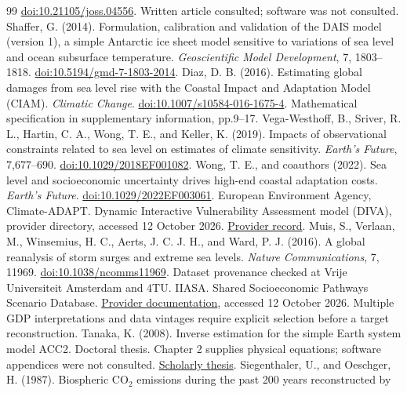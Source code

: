 \documentclass[11pt]{article}
\begin{document}
\begin{thebibliography}{99}
\href{https://doi.org/10.21105/joss.04556}{doi:10.21105/joss.04556}.
Written article consulted; software was not consulted.
 Shaffer, G. (2014). Formulation, calibration and validation
of the DAIS model (version 1), a simple Antarctic ice sheet model sensitive to
variations of sea level and ocean subsurface temperature.
\emph{Geoscientific Model Development}, 7, 1803--1818.
\href{https://doi.org/10.5194/gmd-7-1803-2014}{doi:10.5194/gmd-7-1803-2014}.
 Diaz, D. B. (2016). Estimating global damages from sea level rise
with the Coastal Impact and Adaptation Model (CIAM). \emph{Climatic Change}.
\href{https://doi.org/10.1007/s10584-016-1675-4}{doi:10.1007/s10584-016-1675-4}.
Mathematical specification in supplementary information, pp.9--17.
 Vega-Westhoff, B., Sriver, R. L., Hartin, C. A., Wong, T. E., and
Keller, K. (2019). Impacts of observational constraints related to sea level
on estimates of climate sensitivity. \emph{Earth's Future}, 7,677--690.
\href{https://doi.org/10.1029/2018EF001082}{doi:10.1029/2018EF001082}.
 Wong, T. E., and coauthors (2022). Sea level and
socioeconomic uncertainty drives high-end coastal adaptation costs. \emph{Earth's Future}.
\href{https://doi.org/10.1029/2022EF003061}{doi:10.1029/2022EF003061}.
 European Environment Agency, Climate-ADAPT. Dynamic Interactive
Vulnerability Assessment model (DIVA), provider directory, accessed 12 October 2026.
\href{https://climate-adapt.eea.europa.eu/en/metadata/tools/dynamic-interactive-vulnerability-assessment-model-diva}{Provider record}.
 Muis, S., Verlaan, M., Winsemius, H. C., Aerts, J. C. J. H.,
and Ward, P. J. (2016). A global reanalysis of storm surges and extreme sea
levels. \emph{Nature Communications}, 7, 11969.
\href{https://doi.org/10.1038/ncomms11969}{doi:10.1038/ncomms11969}.
Dataset provenance checked at Vrije Universiteit Amsterdam and 4TU.
 IIASA. Shared Socioeconomic Pathways Scenario Database.
\href{https://iiasa.ac.at/models-tools-data/ssp}{Provider documentation},
accessed 12 October 2026. Multiple GDP interpretations and data vintages require
explicit selection before a target reconstruction.
 Tanaka, K. (2008). Inverse estimation for the simple Earth
system model ACC2. Doctoral thesis. Chapter 2 supplies physical equations;
software appendices were not consulted.
\href{https://pure.mpg.de/rest/items/item_2389991_2/component/file_2389990/content}{Scholarly thesis}.
 Siegenthaler, U., and Oeschger, H. (1987).
Biospheric CO$_2$ emissions during the past 200 years reconstructed by

\end{thebibliography}
\end{document}
